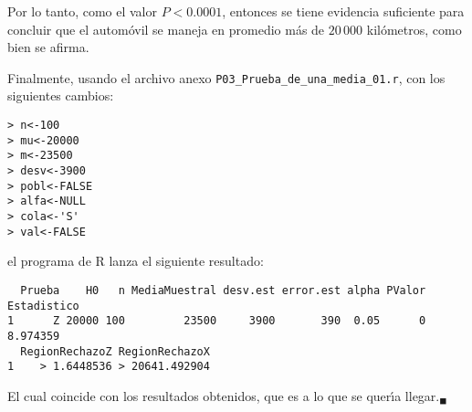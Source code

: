 \begin{solucion}
 \begin{conclusion}
  Por lo tanto, como el valor $P < 0.0001$, entonces se tiene evidencia suficiente para concluir que el autom\'ovil se maneja en promedio m\'as de $20\,000$ kil\'ometros, como bien se afirma.
 \end{conclusion}
 Finalmente, usando el archivo anexo \texttt{P03\_Prueba\_de\_una\_media\_01.r}, con los siguientes cambios:
 \begin{verbatim}
> n<-100
> mu<-20000
> m<-23500
> desv<-3900
> pobl<-FALSE
> alfa<-NULL
> cola<-'S'
> val<-FALSE
 \end{verbatim}
 \vspace{-0.5cm}
 el programa de R lanza el siguiente resultado:
 \begin{verbatim}
  Prueba    H0   n MediaMuestral desv.est error.est alpha PValor Estadistico
1      Z 20000 100         23500     3900       390  0.05      0    8.974359
  RegionRechazoZ RegionRechazoX
1    > 1.6448536 > 20641.492904
 \end{verbatim}
 \vspace{-0.5cm}
 El cual coincide con los resultados obtenidos, que es a lo que se quer\'{\i}a llegar.${}_{\blacksquare}$
\end{solucion}
